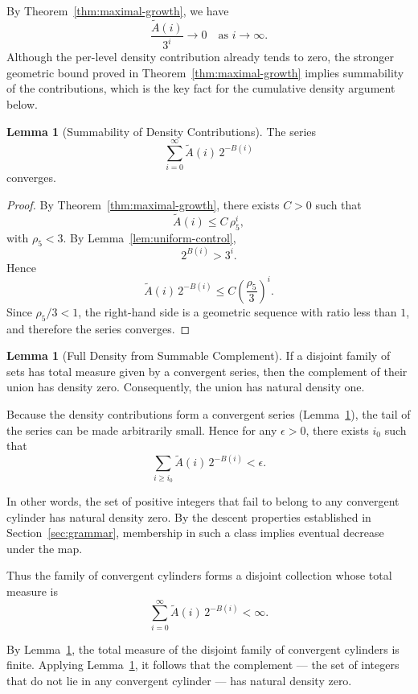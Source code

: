 \documentclass[12pt, oneside]{article}   	%
\numberwithin{equation}{section}          %
\theoremstyle{definition}
\newtheorem{lemma}[theorem]{Lemma}
\begin{document}
By Theorem~\ref{thm:maximal-growth}, we have
\[
\frac{\widetilde A(i)}{3^i} \longrightarrow 0 \quad \text{as } i\to\infty.
\]
Although the per-level density contribution already tends to zero,
the stronger geometric bound proved in Theorem~\ref{thm:maximal-growth}
implies summability of the contributions, which is the key fact for the
cumulative density argument below.

\begin{lemma}[Summability of Density Contributions]
\label{lem:summable-density}
The series
\[
\sum_{i=0}^{\infty} \widetilde A(i)\,2^{-B(i)}
\]
converges.
\end{lemma}

\begin{proof}
By Theorem~\ref{thm:maximal-growth}, there exists $C>0$ such that
\[
\widetilde A(i) \le C\,\rho_5^i,
\]
with $\rho_5<3$.  By Lemma~\ref{lem:uniform-control},
\[
2^{B(i)} > 3^i.
\]
Hence
\[
\widetilde A(i)\,2^{-B(i)}
\le
C\left(\frac{\rho_5}{3}\right)^i.
\]
Since $\rho_5/3<1$, the right-hand side is a geometric sequence with ratio
less than $1$, and therefore the series converges.
\end{proof}

\begin{lemma}[Full Density from Summable Complement]
\label{lem:full-density}
If a disjoint family of sets has total measure given by a convergent series,
then the complement of their union has density zero. Consequently, the union
has natural density one.
\end{lemma}

Because the density contributions form a convergent series
(Lemma~\ref{lem:summable-density}), the tail of the series can be made
arbitrarily small. Hence for any $\epsilon>0$, there exists $i_0$ such that
\[
\sum_{i \ge i_0} \widetilde A(i)\,2^{-B(i)} < \epsilon.
\]

In other words, the set of positive integers that fail to belong to any convergent cylinder
has natural density zero. By the descent properties established in Section~\ref{sec:grammar},
membership in such a class implies eventual decrease under the map.

Thus the family of convergent cylinders forms a disjoint collection whose
total measure is
\[
\sum_{i=0}^{\infty} \widetilde A(i)\,2^{-B(i)} < \infty.
\]

By Lemma~\ref{lem:summable-density}, the total measure of the disjoint
family of convergent cylinders is finite. Applying
Lemma~\ref{lem:full-density}, it follows that the complement
— the set of integers that do not lie in any convergent cylinder —
has natural density zero.
\end{document}
